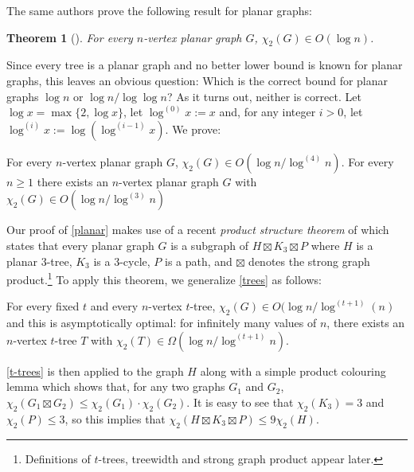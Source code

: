 \documentclass[kpfonts]{patmorin}
\newcommand{\uqs}{\chi_2}
\newtheorem{othertheorem}{Theorem}
\begin{document}
The same authors prove the following result for planar graphs:

\setcounter{othertheorem}{15}
\begin{othertheorem}[\cite{karpas.neiman.ea:on}]\label{planar-graphs}
    For every $n$-vertex planar graph $G$, $\uqs(G)\in O(\log n)$.
\end{othertheorem}

Since every tree is a planar graph and no better lower bound is known for planar graphs, this leaves an obvious question:  Which is the correct bound for planar graphs $\log n$ or $\log n/\log\log n$?  As it turns out, neither is correct.  Let $\log x =\max\{2,\log x\}$, let $\log^{(0)}x:=x$ and, for any integer $i>0$, let $\log^{(i)}x:=\log(\log^{(i-1)} x)$. We prove:


\begin{thm}\label{planar}
    For every $n$-vertex planar graph $G$, $\uqs(G)\in O(\log n/\log^{(4)} n)$.  For every $n\ge 1$ there exists an $n$-vertex planar graph $G$ with $\uqs(G)\in O(\log n/\log^{(3)} n)$
\end{thm}

Our proof of \cref{planar} makes use of a recent \emph{product structure theorem} of \citet{dujmovic.joret.ea:planar} which states that every planar graph $G$ is a subgraph of $H\boxtimes K_3\boxtimes P$ where $H$ is a planar $3$-tree, $K_3$ is a 3-cycle, $P$ is a path, and $\boxtimes$ denotes the strong graph product.\footnote{Definitions of $t$-trees, treewidth and strong graph product appear later.}  To apply this theorem, we generalize \cref{trees} as follows:

\begin{thm}\label{t-trees}
    For every fixed $t$ and every $n$-vertex $t$-tree, $\uqs(G) \in O(\log n/\log^{(t+1)}(n)$ and this is asymptotically optimal: for infinitely many values of $n$, there exists an $n$-vertex $t$-tree $T$ with $\uqs(T)\in\Omega(\log n/\log^{(t+1)} n)$.
\end{thm}

\cref{t-trees} is then applied to the graph $H$ along with a simple product colouring lemma which shows that, for any two graphs $G_1$ and $G_2$, $\uqs(G_1\boxtimes G_2)\le \uqs(G_1)\cdot\uqs(G_2)$. It is easy to see that $\uqs(K_3)=3$ and $\uqs(P)\le 3$, so this implies that $\uqs(H\boxtimes K_3\boxtimes P)\le 9\uqs(H)$.

\end{document}
